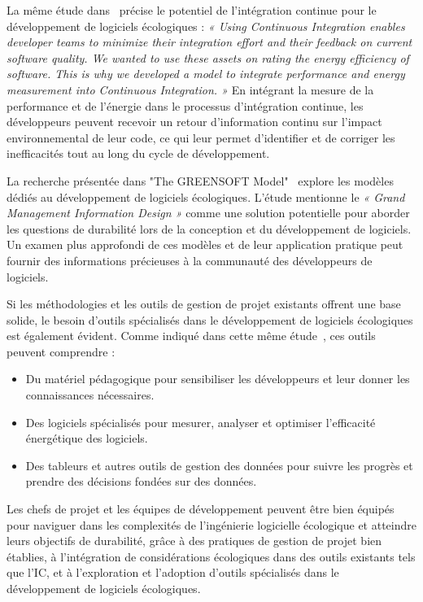 La même étude dans~\cite{GreenAgileMethods} précise le potentiel de l'intégration continue pour le développement de logiciels écologiques : \emph{« Using Continuous Integration enables developer teams to minimize their integration effort and their feedback on current software quality. We wanted to use these assets on rating the energy efficiency of software. This is why we developed a model to integrate performance and energy measurement into Continuous Integration. »} En intégrant la mesure de la performance et de l'énergie dans le processus d'intégration continue, les développeurs peuvent recevoir un retour d'information continu sur l'impact environnemental de leur code, ce qui leur permet d'identifier et de corriger les inefficacités tout au long du cycle de développement.


La recherche présentée dans "The GREENSOFT Model"~\cite{GreenSoftModel} explore les modèles dédiés au développement de logiciels écologiques. L'étude mentionne le \emph{« Grand Management Information Design »} comme une solution potentielle pour aborder les questions de durabilité lors de la conception et du développement de logiciels. Un examen plus approfondi de ces modèles et de leur application pratique peut fournir des informations précieuses à la communauté des développeurs de logiciels.


Si les méthodologies et les outils de gestion de projet existants offrent une base solide, le besoin d'outils spécialisés dans le développement de logiciels écologiques est également évident. Comme indiqué dans cette même étude~\cite{GreenSoftModel}, ces outils peuvent comprendre :
\begin{itemize}
    \item Du matériel pédagogique pour sensibiliser les développeurs et leur donner les connaissances nécessaires.
    \item Des logiciels spécialisés pour mesurer, analyser et optimiser l'efficacité énergétique des logiciels.
    \item Des tableurs et autres outils de gestion des données pour suivre les progrès et prendre des décisions fondées sur des données.
\end{itemize}


Les chefs de projet et les équipes de développement peuvent être bien équipés pour naviguer dans les complexités de l'ingénierie logicielle écologique et atteindre leurs objectifs de durabilité, grâce à des pratiques de gestion de projet bien établies, à l'intégration de considérations écologiques dans des outils existants tels que l'IC, et à l'exploration et l'adoption d'outils spécialisés dans le développement de logiciels écologiques.

